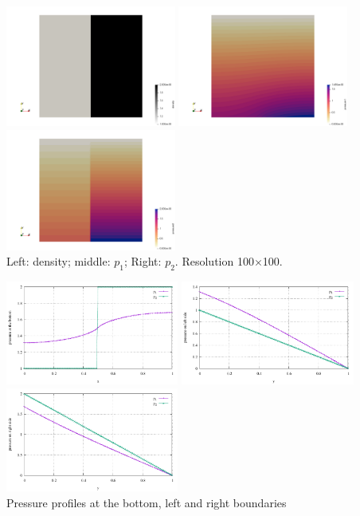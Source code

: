 \begin{center}
\includegraphics[width=5.6cm]{python_codes/fieldstone_119/results/exp3/rho}
\includegraphics[width=5.6cm]{python_codes/fieldstone_119/results/exp3/p1}
\includegraphics[width=5.6cm]{python_codes/fieldstone_119/results/exp3/p2}\\
{\captionfont Left: density; middle: $p_1$; Right: $p_2$. Resolution 100$\times$100.}
\end{center}

\begin{center}
\includegraphics[width=5.7cm]{python_codes/fieldstone_119/results/exp3/bottom}
\includegraphics[width=5.7cm]{python_codes/fieldstone_119/results/exp3/left}
\includegraphics[width=5.7cm]{python_codes/fieldstone_119/results/exp3/right}\\
{\captionfont Pressure profiles at the bottom, left and right boundaries}
\end{center}

